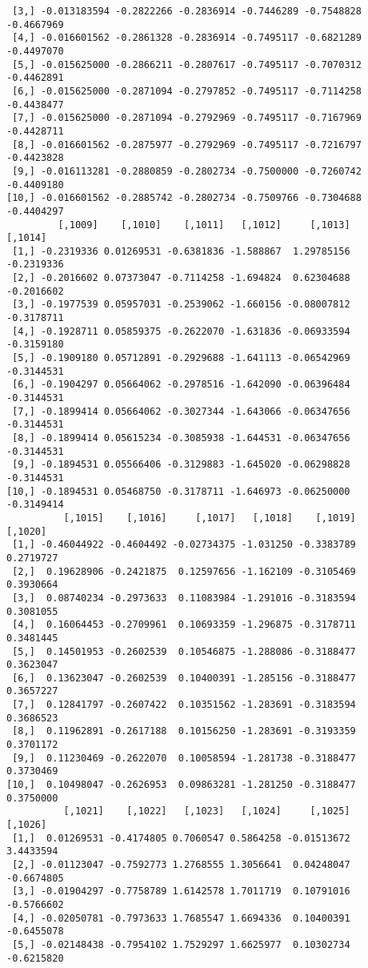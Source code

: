 \documentclass[
  letterpaper,
  DIV=11,
  numbers=noendperiod]{scrreprt}
\begin{document}
\begin{verbatim}
 [3,] -0.013183594 -0.2822266 -0.2836914 -0.7446289 -0.7548828 -0.4667969
 [4,] -0.016601562 -0.2861328 -0.2836914 -0.7495117 -0.6821289 -0.4497070
 [5,] -0.015625000 -0.2866211 -0.2807617 -0.7495117 -0.7070312 -0.4462891
 [6,] -0.015625000 -0.2871094 -0.2797852 -0.7495117 -0.7114258 -0.4438477
 [7,] -0.015625000 -0.2871094 -0.2792969 -0.7495117 -0.7167969 -0.4428711
 [8,] -0.016601562 -0.2875977 -0.2792969 -0.7495117 -0.7216797 -0.4423828
 [9,] -0.016113281 -0.2880859 -0.2802734 -0.7500000 -0.7260742 -0.4409180
[10,] -0.016601562 -0.2885742 -0.2802734 -0.7509766 -0.7304688 -0.4404297
         [,1009]    [,1010]    [,1011]   [,1012]     [,1013]    [,1014]
 [1,] -0.2319336 0.01269531 -0.6381836 -1.588867  1.29785156 -0.2319336
 [2,] -0.2016602 0.07373047 -0.7114258 -1.694824  0.62304688 -0.2016602
 [3,] -0.1977539 0.05957031 -0.2539062 -1.660156 -0.08007812 -0.3178711
 [4,] -0.1928711 0.05859375 -0.2622070 -1.631836 -0.06933594 -0.3159180
 [5,] -0.1909180 0.05712891 -0.2929688 -1.641113 -0.06542969 -0.3144531
 [6,] -0.1904297 0.05664062 -0.2978516 -1.642090 -0.06396484 -0.3144531
 [7,] -0.1899414 0.05664062 -0.3027344 -1.643066 -0.06347656 -0.3144531
 [8,] -0.1899414 0.05615234 -0.3085938 -1.644531 -0.06347656 -0.3144531
 [9,] -0.1894531 0.05566406 -0.3129883 -1.645020 -0.06298828 -0.3144531
[10,] -0.1894531 0.05468750 -0.3178711 -1.646973 -0.06250000 -0.3149414
          [,1015]    [,1016]     [,1017]   [,1018]    [,1019]   [,1020]
 [1,] -0.46044922 -0.4604492 -0.02734375 -1.031250 -0.3383789 0.2719727
 [2,]  0.19628906 -0.2421875  0.12597656 -1.162109 -0.3105469 0.3930664
 [3,]  0.08740234 -0.2973633  0.11083984 -1.291016 -0.3183594 0.3081055
 [4,]  0.16064453 -0.2709961  0.10693359 -1.296875 -0.3178711 0.3481445
 [5,]  0.14501953 -0.2602539  0.10546875 -1.288086 -0.3188477 0.3623047
 [6,]  0.13623047 -0.2602539  0.10400391 -1.285156 -0.3188477 0.3657227
 [7,]  0.12841797 -0.2607422  0.10351562 -1.283691 -0.3183594 0.3686523
 [8,]  0.11962891 -0.2617188  0.10156250 -1.283691 -0.3193359 0.3701172
 [9,]  0.11230469 -0.2622070  0.10058594 -1.281738 -0.3188477 0.3730469
[10,]  0.10498047 -0.2626953  0.09863281 -1.281250 -0.3188477 0.3750000
          [,1021]    [,1022]   [,1023]   [,1024]     [,1025]    [,1026]
 [1,]  0.01269531 -0.4174805 0.7060547 0.5864258 -0.01513672  3.4433594
 [2,] -0.01123047 -0.7592773 1.2768555 1.3056641  0.04248047 -0.6674805
 [3,] -0.01904297 -0.7758789 1.6142578 1.7011719  0.10791016 -0.5766602
 [4,] -0.02050781 -0.7973633 1.7685547 1.6694336  0.10400391 -0.6455078
 [5,] -0.02148438 -0.7954102 1.7529297 1.6625977  0.10302734 -0.6215820

\end{verbatim}
\end{document}
